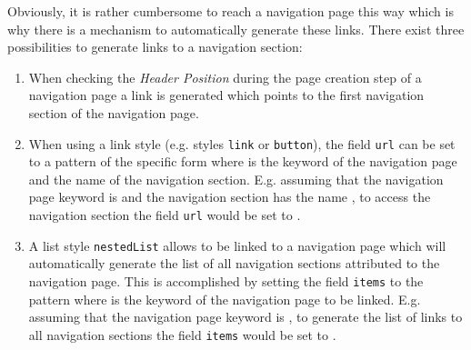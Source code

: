 \documentclass[a4paper,oneside]{book}
\begin{document}
Obviously, it is rather cumbersome to reach a navigation page this way which is why there is a mechanism to automatically generate these links.
There exist three possibilities to generate links to a navigation section:
\begin{enumerate}
    \item When checking the \emph{Header Position} during the page creation step of a navigation page a link is generated which points to the first navigation section of the navigation page.
    \item When using a link style (e.g. styles \texttt{link} or \texttt{button}), the field \texttt{url} can be set to a pattern of the specific form
         where  is the keyword of the navigation page and  the name of the navigation section.
        E.g. assuming that the navigation page keyword is  and the navigation section has the name , to access the navigation section the field \texttt{url} would be set to .
    \item A list style \texttt{nestedList} allows to be linked to a navigation page which will automatically generate the list of all navigation sections attributed to the navigation page.
        This is accomplished by setting the field \texttt{items} to the pattern  where  is the keyword of the navigation page to be linked.
        E.g. assuming that the navigation page keyword is , to generate the list of links to all navigation sections the field \texttt{items} would be set to .
\end{enumerate}
\end{document}
